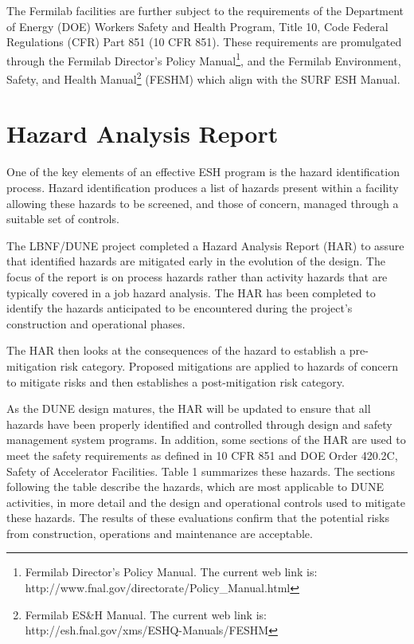 The Fermilab facilities are further subject to the requirements of the
Department of Energy (DOE) Workers Safety and Health Program, Title
10, Code Federal Regulations (CFR) Part 851 (10 CFR 851).  These
requirements are promulgated through the Fermilab Director’s Policy
Manual\footnote{Fermilab Director's Policy Manual. The current web
  link is: http://www.fnal.gov/directorate/Policy\_Manual.html}, and
the Fermilab Environment, Safety, and Health Manual\footnote{Fermilab
  ES\&H Manual. The current web link is:
  http://esh.fnal.gov/xms/ESHQ-Manuals/FESHM} (FESHM) which align with
the SURF ESH Manual.

\section{Hazard Analysis Report}

One of the key elements of an effective ESH program is the hazard
identification process. Hazard identification produces a list of
hazards present within a facility allowing these hazards to be
screened, and those of concern, managed through a suitable set of
controls.

The LBNF/DUNE project completed a Hazard Analysis Report (HAR) to
assure that identified hazards are mitigated early in the evolution of
the design.  The focus of the report is on process hazards rather than
activity hazards that are typically covered in a job hazard analysis.
The HAR has been completed to identify the hazards anticipated to be
encountered during the project’s construction and operational phases.

The HAR then looks at the consequences of the hazard to establish a
pre-mitigation risk category. Proposed mitigations are applied to
hazards of concern to mitigate risks and then establishes a
post-mitigation risk category.

As the DUNE design matures, the HAR will be updated to ensure that all
hazards have been properly identified and controlled through design
and safety management system programs.  In addition, some sections of
the HAR are used to meet the safety requirements as defined in 10 CFR
851 and DOE Order 420.2C, Safety of Accelerator Facilities.  Table 1
summarizes these hazards.  The sections following the table describe
the hazards, which are most applicable to DUNE activities, in more
detail and the design and operational controls used to mitigate these
hazards. The results of these evaluations confirm that the potential
risks from construction, operations and maintenance are acceptable.

